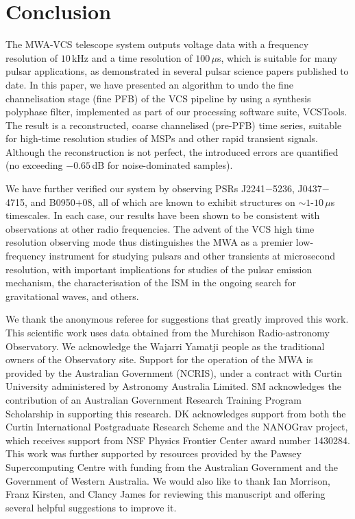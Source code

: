 \documentclass{pasa}%
\newcommand{\vcstools}{VCSTools}
\newcommand{\psrslowB}{B0950$+$08}
\newcommand{\psrkaurJ}{J2241$-$5236}
\newcommand{\psrbhatJ}{J0437$-$4715}
\begin{document}
\section{Conclusion}

The MWA-VCS telescope system outputs voltage data with a frequency resolution of $10\,$kHz and a time resolution of $100\,\mu$s, which is suitable for many pulsar applications, as demonstrated in several pulsar science papers published to date.
In this paper, we have presented an algorithm to undo the fine channelisation stage (fine PFB) of the VCS pipeline by using a synthesis polyphase filter, implemented as part of our processing software suite, \vcstools{}.
The result is a reconstructed, coarse channelised (pre-PFB) time series, suitable for high-time resolution studies of MSPs and other rapid transient signals.
Although the reconstruction is not perfect, the introduced errors are quantified (no exceeding $-0.65\,$dB for noise-dominated samples).

We have further verified our system by observing PSRs \psrkaurJ{}, \psrbhatJ{}, and \psrslowB{}, all of which are known to exhibit structures on $\sim 1$-$10\,\mu$s timescales.
In each case, our results have been shown to be consistent with observations at other radio frequencies.
The advent of the VCS high time resolution observing mode thus distinguishes the MWA as a premier low-frequency instrument for studying pulsars and other transients at microsecond resolution, with important implications for studies of the pulsar emission mechanism, the characterisation of the ISM in the ongoing search for gravitational waves, and others.

\begin{acknowledgements}
We thank the anonymous referee for suggestions that greatly improved this work.
This scientific work uses data obtained from the Murchison Radio-astronomy Observatory. We acknowledge the Wajarri Yamatji people as the traditional owners of the Observatory site.
Support for the operation of the MWA is provided by the Australian Government (NCRIS), under a contract with Curtin University administered by Astronomy Australia Limited.
SM acknowledges the contribution of an Australian Government Research Training Program Scholarship in supporting this research.
DK acknowledges support from both the Curtin International Postgraduate Research Scheme and the NANOGrav project, which receives support from NSF Physics Frontier Center award number 1430284.
This work was further supported by resources provided by the Pawsey Supercomputing Centre with funding from the Australian Government and the Government of Western Australia.
We would also like to thank Ian Morrison, Franz Kirsten, and Clancy James for reviewing this manuscript and offering several helpful suggestions to improve it.
\end{acknowledgements}
\end{document}
